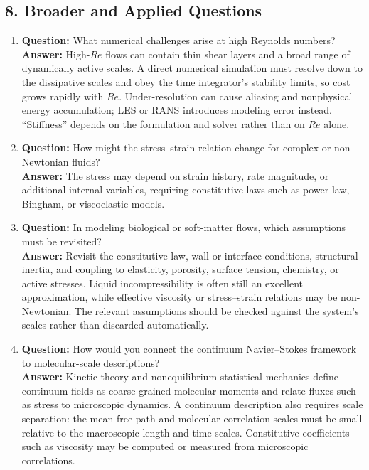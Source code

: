\documentclass[12pt]{article}
\begin{document}
\subsection*{8. Broader and Applied Questions}
\begin{enumerate}
\item \textbf{Question:} What numerical challenges arise at high Reynolds numbers?\\
\textbf{Answer:} High-$Re$ flows can contain thin shear layers and a broad range of dynamically active scales. A direct numerical simulation must resolve down to the dissipative scales and obey the time integrator's stability limits, so cost grows rapidly with $Re$. Under-resolution can cause aliasing and nonphysical energy accumulation; LES or RANS introduces modeling error instead. ``Stiffness'' depends on the formulation and solver rather than on $Re$ alone.

\item \textbf{Question:} How might the stress--strain relation change for complex or non-Newtonian fluids?\\
\textbf{Answer:} The stress may depend on strain history, rate magnitude, or additional internal variables, requiring constitutive laws such as power-law, Bingham, or viscoelastic models.

\item \textbf{Question:} In modeling biological or soft-matter flows, which assumptions must be revisited?\\
\textbf{Answer:} Revisit the constitutive law, wall or interface conditions, structural inertia, and coupling to elasticity, porosity, surface tension, chemistry, or active stresses. Liquid incompressibility is often still an excellent approximation, while effective viscosity or stress--strain relations may be non-Newtonian. The relevant assumptions should be checked against the system's scales rather than discarded automatically.

\item \textbf{Question:} How would you connect the continuum Navier--Stokes framework to molecular-scale descriptions?\\
\textbf{Answer:} Kinetic theory and nonequilibrium statistical mechanics define continuum fields as coarse-grained molecular moments and relate fluxes such as stress to microscopic dynamics. A continuum description also requires scale separation: the mean free path and molecular correlation scales must be small relative to the macroscopic length and time scales. Constitutive coefficients such as viscosity may be computed or measured from microscopic correlations.
\end{enumerate}
\end{document}
